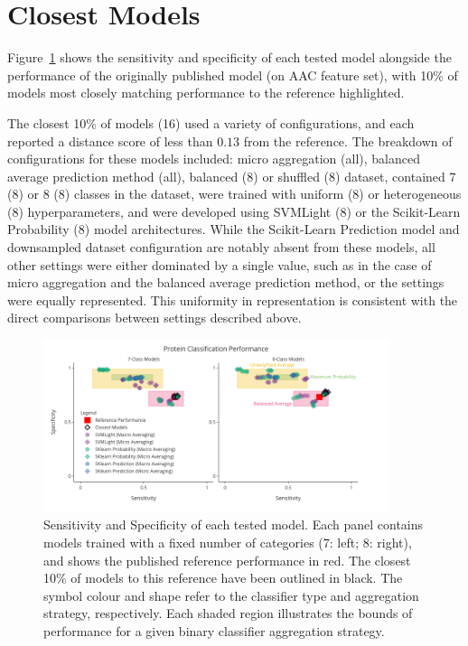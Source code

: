 \section{Closest Models}
Figure~\ref{fig:modelPerformance} shows the sensitivity 
and specificity of each tested model alongside the performance of the originally published model (on AAC feature set), 
with 10\% of models most closely matching performance to the reference highlighted.

The closest 10\% of models (16) used a variety of configurations, and each reported a distance score of less than
$0.13$ from the reference. The breakdown of configurations for these models included: micro aggregation (all), balanced
average prediction method (all), balanced (8) or shuffled (8) dataset, contained 7 (8) or 8 (8) classes in the dataset,
were trained with uniform (8) or heterogeneous (8) hyperparameters, and were developed using SVMLight (8) or the
Scikit-Learn Probability (8) model architectures. While the Scikit-Learn Prediction model and downsampled dataset configuration
are notably absent from these models, all other settings were either dominated by a single value, such as in the case
of micro aggregation and the balanced average prediction method, or the settings were equally represented. This
uniformity in representation is consistent with the direct comparisons between settings described above.

\begin{figure}[ht]
    \centering
    \includegraphics[width=0.90\textwidth]{figures/14ModelPerformance.png}
    \caption{Sensitivity and Specificity of each tested model. Each panel contains models 
    trained with a fixed number of categories (7: left; 8: right), and shows the published 
    reference performance in red. The closest 10\% of models to this reference have been 
    outlined in black. The symbol colour and shape refer to the classifier type and aggregation 
    strategy, respectively. Each shaded region illustrates the bounds of performance for a given 
    binary classifier aggregation strategy.}
    \label{fig:modelPerformance}
\end{figure}

